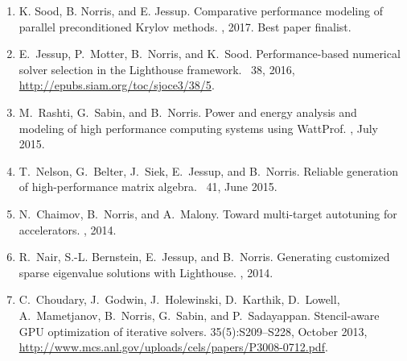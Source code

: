 \begin{enumerate}
\setlength{\itemsep}{0.2pt}

\item %
K. Sood, B. Norris, and E. Jessup. 
\newblock Comparative performance modeling of parallel 
preconditioned Krylov methods. 
, 2017. Best paper finalist.

\item %
E.~Jessup, P.~Motter, B.~Norris, and K.~Sood.
\newblock Performance-based numerical solver selection in the {L}ighthouse
  framework.
~38, 2016,
  \url{http://epubs.siam.org/toc/sjoce3/38/5}.

\item %
M.~Rashti, G.~Sabin, and B.~Norris.
\newblock Power and energy analysis and modeling of high performance computing
  systems using {WattProf}.
, July 2015.

\item   %
T.~Nelson, G.~Belter, J.~Siek, E.~Jessup, and B.~Norris.
\newblock Reliable generation of high-performance matrix algebra.
~41, June 2015.

\item   %
N.~Chaimov, B.~Norris, and A.~Malony.
\newblock Toward multi-target autotuning for accelerators.
,
  2014.

\item    %
R.~Nair, S.-L. Bernstein, E.~Jessup, and B.~Norris.
\newblock Generating customized sparse eigenvalue solutions with {L}ighthouse.
, 2014.

\item %
C.~Choudary, J.~Godwin, J.~Holewinski, D.~Karthik, D.~Lowell, A.~Mametjanov,
  B.~Norris, G.~Sabin, and P.~Sadayappan.
\newblock Stencil-aware {GPU} optimization of iterative solvers.
 35(5):S209--S228, October
  2013, \url{http://www.mcs.anl.gov/uploads/cels/papers/P3008-0712.pdf}.


\end{enumerate}

